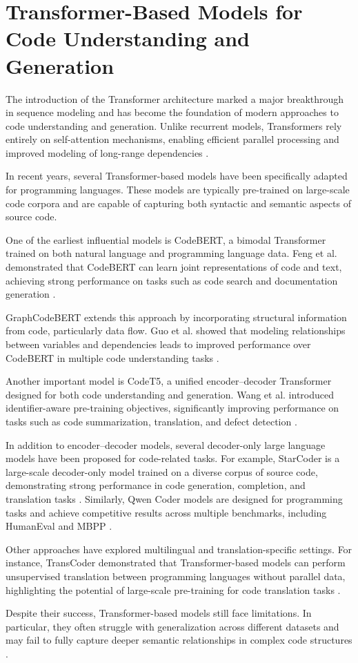 \section{Transformer-Based Models for Code Understanding and Generation}


The introduction of the Transformer architecture marked a major breakthrough in
sequence modeling and has become the foundation of modern approaches to code
understanding and generation. Unlike recurrent models, Transformers rely
entirely on self-attention mechanisms, enabling efficient parallel processing
and improved modeling of long-range dependencies \cite{vaswani2017}.

In recent years, several Transformer-based models have been specifically adapted
for programming languages. These models are typically pre-trained on large-scale
code corpora and are capable of capturing both syntactic and semantic aspects of
source code.

One of the earliest influential models is CodeBERT, a bimodal Transformer
trained on both natural language and programming language data. Feng et al.
demonstrated that CodeBERT can learn joint representations of code and text,
achieving strong performance on tasks such as code search and documentation
generation \cite{feng2020codebert}.

GraphCodeBERT extends this approach by incorporating structural information from
code, particularly data flow. Guo et al. showed that modeling relationships
between variables and dependencies leads to improved performance over CodeBERT
in multiple code understanding tasks \cite{guo2020graphcodebert}.

Another important model is CodeT5, a unified encoder--decoder Transformer
designed for both code understanding and generation. Wang et al. introduced
identifier-aware pre-training objectives, significantly improving performance
on tasks such as code summarization, translation, and defect detection
\cite{wang2021codet5}.

In addition to encoder--decoder models, several decoder-only large language
models have been proposed for code-related tasks. For example, StarCoder is a
large-scale decoder-only model trained on a diverse corpus of source code, demonstrating strong
performance in code generation, completion, and translation tasks
\cite{starcoder}. Similarly, Qwen Coder models are designed for programming
tasks and achieve competitive results across multiple benchmarks, including
HumanEval and MBPP \cite{qwen_coder}.

Other approaches have explored multilingual and translation-specific settings.
For instance, TransCoder demonstrated that Transformer-based models can perform
unsupervised translation between programming languages without parallel data,
highlighting the potential of large-scale pre-training for code translation
tasks \cite{roziere2020transcoder}.

Despite their success, Transformer-based models still face limitations. In
particular, they often struggle with generalization across different datasets
and may fail to fully capture deeper semantic relationships in complex code
structures \cite{saberi2023model}.